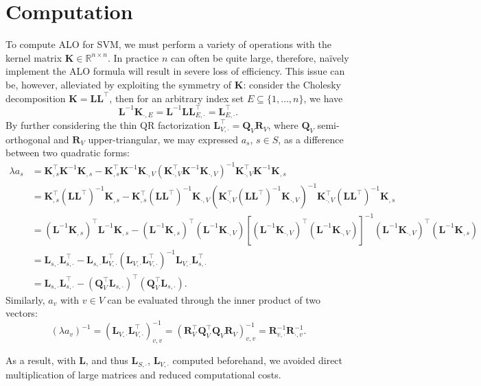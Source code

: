 \documentclass[11pt]{article}
\newcommand{\bK}{\bm{K}}
\newcommand{\bL}{\bm{L}}
\newcommand{\bQ}{\bm{Q}}
\newcommand{\bR}{\bm{R}}
\newcommand{\bbr}{\mathbb{R}}
\begin{document}
\section{Computation}
To compute ALO for SVM, we must perform a variety of operations with the kernel matrix \(\bK\in\bbr^{n\times n}\). In practice \(n\) can often be quite large, therefore, na\"{i}vely implement the ALO formula will result in severe loss of efficiency. This issue can be, however, alleviated by exploiting the symmetry of \(\bK\): consider the Cholesky decomposition \(\bK=\bL\bL^\top\), then for an arbitrary index set \(E\subseteq\{1,\dotsc,n\}\), we have \[\bL^{-1}\bK_{\cdot,E}=\bL^{-1}\bL\bL^{\top}_{E,\cdot}=\bL^{\top}_{E,\cdot}.\] By further considering the thin QR factorization \(\bL^{\top}_{V,\cdot}=\bQ_V\bR_V\), where \(\bQ_V\) semi-orthogonal and \(\bR_V\) upper-triangular, we may expressed \(a_s\), \(s\in S\), as a difference between two quadratic forms:
	\begin{align*}
	\lambda a_s&=\bK_{, s}^\top\bK^{-1}\bK_{, s}-\bK_{, s}^\top\bK^{-1}\bK_{\cdot,V}\left(\bK_{\cdot,V}^\top\bK^{-1}\bK_{\cdot,V}\right)^{-1}\bK_{\cdot,V}^\top\bK^{-1}\bK_{, s}\\
	&=\bK_{, s}^\top(\bL\bL^\top)^{-1}\bK_{, s}-\bK_{, s}^\top(\bL\bL^\top)^{-1}\bK_{\cdot,V}\left(\bK_{\cdot,V}^\top(\bL\bL^\top)^{-1}\bK_{\cdot,V}\right)^{-1}\bK^\top_{\cdot,V}(\bL\bL^\top)^{-1}\bK_{, s}\\
	&=(\bL^{-1}\bK_{, s})^\top\bL^{-1}\bK_{, s}-(\bL^{-1}\bK_{, s})^\top(\bL^{-1}\bK_{\cdot,V})\left[(\bL^{-1}\bK_{\cdot,V})^\top(\bL^{-1}\bK_{\cdot,V})\right]^{-1}(\bL^{-1}\bK_{\cdot,V})^\top(\bL^{-1}\bK_{, s})\\
	&=\bL_{s,\cdot}\bL^{\top}_{s,\cdot}-\bL_{s,\cdot}\bL^{\top}_{V,\cdot}\left(\bL_{V,\cdot}\bL^{\top}_{V,\cdot}\right)^{-1}\bL_{V,\cdot}\bL^{\top}_{s,\cdot}\\
	&=\bL_{s,\cdot}\bL^{\top}_{s,\cdot}-(\bQ_V^\top\bL_{s,\cdot})^\top(\bQ_V^\top\bL_{s,\cdot}).
	\end{align*}
Similarly, \(a_v\) with \(v\in V\) can be evaluated through the inner product of two vectors: \[(\lambda a_v)^{-1}=\left(\bL_{V,\cdot}\bL^{\top}_{V,\cdot}\right)^{-1}_{v,v}=\left(\bR_V^\top\bQ_V^\top\bQ_V\bR_V\right)^{-1}_{v,v}=\bR^{-1}_{v,\cdot}\bR^{-1}_{\cdot,v}.\]

As a result, with \(\bL\), and thus \(\bL_{S,\cdot}\), \(\bL_{V,\cdot}\) computed beforehand, we avoided direct multiplication of large matrices and reduced computational costs.
\end{document}

